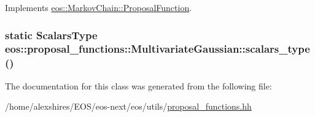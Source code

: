 Implements \hyperlink{structeos_1_1MarkovChain_1_1ProposalFunction_a2b296008d32b1cd008e59cde1228705f}{eos::MarkovChain::ProposalFunction}.\hypertarget{classeos_1_1proposal__functions_1_1MultivariateGaussian_aca175ee100311315c4ddb34757b68a3e}{
\subsubsection[{scalars\_\-type}]{\setlength{\rightskip}{0pt plus 5cm}static {\bf ScalarsType} eos::proposal\_\-functions::MultivariateGaussian::scalars\_\-type ()}}
\label{classeos_1_1proposal__functions_1_1MultivariateGaussian_aca175ee100311315c4ddb34757b68a3e}


The documentation for this class was generated from the following file:\begin{DoxyCompactItemize}
\item 
/home/alexshires/EOS/eos-\/next/eos/utils/\hyperlink{proposal__functions_8hh}{proposal\_\-functions.hh}\end{DoxyCompactItemize}

